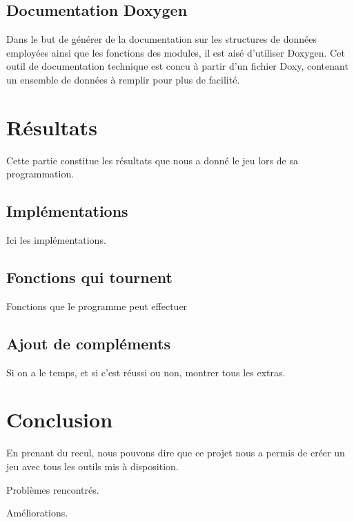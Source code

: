 \documentclass[a4paper,11pt]{report}
\begin{document}
 \section{Documentation Doxygen}
 	Dans le but de générer de la documentation sur les structures de données employées ainsi que les fonctions des modules, il est aisé d'utiliser Doxygen. Cet outil de documentation technique est concu à partir d'un fichier Doxy, contenant un ensemble de données à remplir pour plus de facilité.
  
  \chapter{Résultats}
  Cette partie constitue les résultats que nous a donné le jeu lors de sa programmation.
    \section{Implémentations}
    Ici les implémentations.
    \section{Fonctions qui tournent}
    Fonctions que le programme peut effectuer
    \section{Ajout de compléments}
    Si on a le temps, et si c'est réussi ou non, montrer tous les extras.
  \chapter{Conclusion}
  En prenant du recul, nous pouvons dire que ce projet nous a permis de créer un jeu avec tous les outils mis à disposition.

  Problèmes rencontrés.

  Améliorations.
\end{document}
